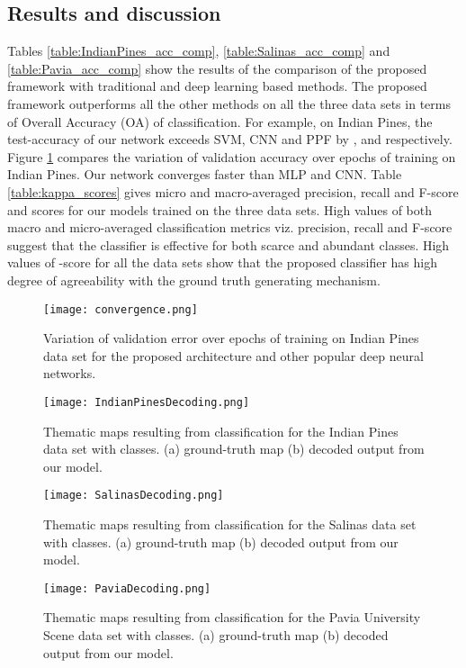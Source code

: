 \documentclass[journal]{IEEEtran}
\begin{document}
\subsection{Results and discussion}
Tables \ref{table:IndianPines_acc_comp}, \ref{table:Salinas_acc_comp} and \ref{table:Pavia_acc_comp} show the results of the comparison of the proposed framework with traditional and deep learning based methods. The proposed framework outperforms all the other methods on all the three data sets in terms of Overall Accuracy (OA) of classification. For example, on Indian Pines, the test-accuracy of our network exceeds SVM, CNN and PPF by ,  and  respectively. Figure \ref{fig:convergence} compares the variation of validation accuracy over epochs of training on Indian Pines. Our network converges faster than MLP and CNN. Table \ref{table:kappa_scores} gives micro and macro-averaged precision, recall and F-score and  scores for our models trained on the three data sets. High values of both macro and micro-averaged classification metrics viz. precision, recall and F-score suggest that the classifier is effective for both scarce and abundant classes. High values of -score for all the data sets show that the proposed classifier has high degree of agreeability with the ground truth generating mechanism.

\begin{figure}
\centering
	\texttt{[image: convergence.png]}
	\caption{Variation of validation error over epochs of training on Indian Pines data set for the proposed architecture and other popular deep neural networks.}
	\label{fig:convergence}
\end{figure}

\begin{figure}
\centering
	\texttt{[image: IndianPinesDecoding.png]}
	\caption{Thematic maps resulting from classification for the Indian Pines data set with  classes. (a) ground-truth map (b) decoded output from our model.}
	\label{fig:IndianPines_decoding}
\end{figure}

\begin{figure}
\centering
	\texttt{[image: SalinasDecoding.png]}
	\caption{Thematic maps resulting from classification for the Salinas data set with  classes. (a) ground-truth map (b) decoded output from our model.}
	\label{fig:Salinas_decoding}
\end{figure}

\begin{figure}
\centering
	\texttt{[image: PaviaDecoding.png]}
	\caption{Thematic maps resulting from classification for the Pavia University Scene data set with  classes. (a) ground-truth map (b) decoded output from our model.}
	\label{fig:Pavia_decoding}
\end{figure}
\end{document}
